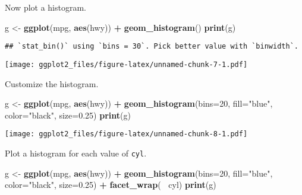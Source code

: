 \documentclass[]{article}
\newenvironment{Shaded}{\begin{snugshade}}{\end{snugshade}}
\newcommand{\KeywordTok}[1]{\textcolor[rgb]{0.13,0.29,0.53}{\textbf{#1}}}
\newcommand{\DataTypeTok}[1]{\textcolor[rgb]{0.13,0.29,0.53}{#1}}
\newcommand{\DecValTok}[1]{\textcolor[rgb]{0.00,0.00,0.81}{#1}}
\newcommand{\FloatTok}[1]{\textcolor[rgb]{0.00,0.00,0.81}{#1}}
\newcommand{\StringTok}[1]{\textcolor[rgb]{0.31,0.60,0.02}{#1}}
\newcommand{\OperatorTok}[1]{\textcolor[rgb]{0.81,0.36,0.00}{\textbf{#1}}}
\newcommand{\NormalTok}[1]{#1}
\begin{document}
Now plot a histogram.

\begin{Shaded}
\begin{Highlighting}[]
\NormalTok{g <-}\StringTok{ }\KeywordTok{ggplot}\NormalTok{(mpg, }\KeywordTok{aes}\NormalTok{(hwy)) }\OperatorTok{+}
\StringTok{    }\KeywordTok{geom_histogram}\NormalTok{()}
\KeywordTok{print}\NormalTok{(g)}
\end{Highlighting}
\end{Shaded}

\begin{verbatim}
## `stat_bin()` using `bins = 30`. Pick better value with `binwidth`.
\end{verbatim}

\texttt{[image: ggplot2\_files/figure-latex/unnamed-chunk-7-1.pdf]}

Customize the histogram.

\begin{Shaded}
\begin{Highlighting}[]
\NormalTok{g <-}\StringTok{ }\KeywordTok{ggplot}\NormalTok{(mpg, }\KeywordTok{aes}\NormalTok{(hwy)) }\OperatorTok{+}
\StringTok{    }\KeywordTok{geom_histogram}\NormalTok{(}\DataTypeTok{bins=}\DecValTok{20}\NormalTok{, }\DataTypeTok{fill=}\StringTok{"blue"}\NormalTok{, }\DataTypeTok{color=}\StringTok{"black"}\NormalTok{, }\DataTypeTok{size=}\FloatTok{0.25}\NormalTok{)}
\KeywordTok{print}\NormalTok{(g)}
\end{Highlighting}
\end{Shaded}

\texttt{[image: ggplot2\_files/figure-latex/unnamed-chunk-8-1.pdf]}

Plot a histogram for each value of \texttt{cyl}.

\begin{Shaded}
\begin{Highlighting}[]
\NormalTok{g <-}\StringTok{ }\KeywordTok{ggplot}\NormalTok{(mpg, }\KeywordTok{aes}\NormalTok{(hwy)) }\OperatorTok{+}
\StringTok{    }\KeywordTok{geom_histogram}\NormalTok{(}\DataTypeTok{bins=}\DecValTok{20}\NormalTok{, }\DataTypeTok{fill=}\StringTok{"blue"}\NormalTok{, }\DataTypeTok{color=}\StringTok{"black"}\NormalTok{, }\DataTypeTok{size=}\FloatTok{0.25}\NormalTok{) }\OperatorTok{+}
\StringTok{    }\KeywordTok{facet_wrap}\NormalTok{(}\OperatorTok{~}\StringTok{ }\NormalTok{cyl)}
\KeywordTok{print}\NormalTok{(g)}
\end{Highlighting}
\end{Shaded}
\end{document}
